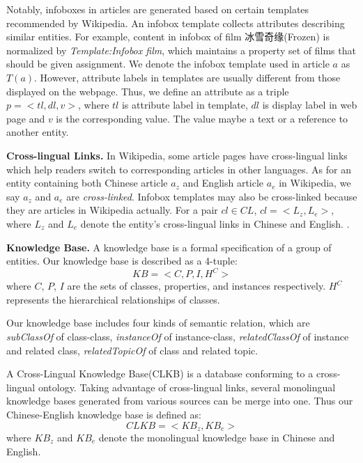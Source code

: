 \documentclass[runningheads,a4paper]{llncs}
\newcommand{\para}[1]{\vspace{0.1cm}\noindent\textbf{#1}}
\begin{document}
Notably, infoboxes in articles are generated based on certain templates recommended by Wikipedia. An infobox template collects attributes describing similar entities. For example, content in infobox of film 冰雪奇缘(Frozen) is normalized by \emph{Template:Infobox film}, which maintains a property set of films that should be given assignment. We denote the infobox template used in article $a$ as $T(a)$. However, attribute labels in templates are usually different from those displayed on the webpage. Thus, we define an attribute as a triple $p=<tl,dl,v>$, where $tl$ is attribute label in template, $dl$ is display label in web page and $v$ is the corresponding value. The value maybe a text or a reference to another entity.

\para{Cross-lingual Links.} In Wikipedia, some article pages have cross-lingual links which help readers switch to corresponding articles in other languages. %
As for an entity containing both Chinese article $a_{z}$ and English article $a_{e}$ in Wikipedia, we say $a_{z}$ and $a_{e}$ are \emph{cross-linked}. Infobox templates may also be cross-linked because they are articles in Wikipedia actually. For a pair $cl \in CL$, $cl = <L_{z}, L_{e}>$, where $L_{z}$ and $L_{e}$ denote the entity's cross-lingual links in Chinese and English. .

\para{Knowledge Base.} A knowledge base is a formal specification of a group of entities. Our knowledge base is described as a 4-tuple:
\begin{displaymath}
    KB = <C,P,I,H^C>
\end{displaymath}
where $C$, $P$, $I$ are the sets of classes, properties, and instances respectively. $H^C$ represents the hierarchical relationships of classes. 

Our knowledge base includes four kinds of semantic relation, which are \textit{subClassOf} of class-class, \textit{instanceOf} of instance-class, \textit{relatedClassOf} of instance and related class, \textit{relatedTopicOf} of class and related topic.

A Cross-Lingual Knowledge Base(CLKB) is a database conforming to a cross-lingual ontology. Taking advantage of cross-lingual links, several monolingual knowledge bases generated from various sources can be merge into one. Thus our Chinese-English knowledge base is defined as:
\begin{displaymath}
    CLKB = <KB_{z}, KB_{e}>
\end{displaymath}
where $KB_{z}$ and $KB_{e}$ denote the monolingual knowledge base in Chinese and English. 
\end{document}
